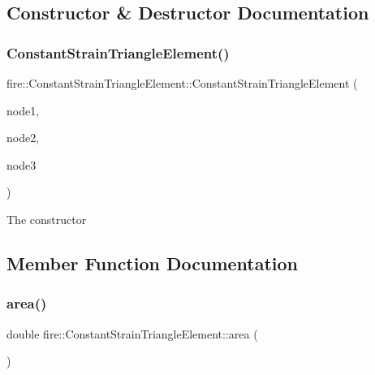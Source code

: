 \subsection{Constructor \& Destructor Documentation}
\mbox{\label{a00764_aa54c09f1dd7cacaf1f4f0b1428859c00}} 
\subsubsection{\texorpdfstring{Constant\+Strain\+Triangle\+Element()}{ConstantStrainTriangleElement()}}
{\footnotesize\ttfamily fire\+::\+Constant\+Strain\+Triangle\+Element\+::\+Constant\+Strain\+Triangle\+Element (\begin{DoxyParamCaption}\item[{const \hyperlink{a00189_a92dafcc05a788e1065a5792b67f0f70e}{Two\+D\+Node} \&}]{node1,  }\item[{const \hyperlink{a00189_a92dafcc05a788e1065a5792b67f0f70e}{Two\+D\+Node} \&}]{node2,  }\item[{const \hyperlink{a00189_a92dafcc05a788e1065a5792b67f0f70e}{Two\+D\+Node} \&}]{node3 }\end{DoxyParamCaption})}

The constructor 

\subsection{Member Function Documentation}
\mbox{\label{a00764_acd197716c6bffaa3c7b472661f0e5ca4}} 
\subsubsection{\texorpdfstring{area()}{area()}}
{\footnotesize\ttfamily double fire\+::\+Constant\+Strain\+Triangle\+Element\+::area (\begin{DoxyParamCaption}{ }\end{DoxyParamCaption})}


